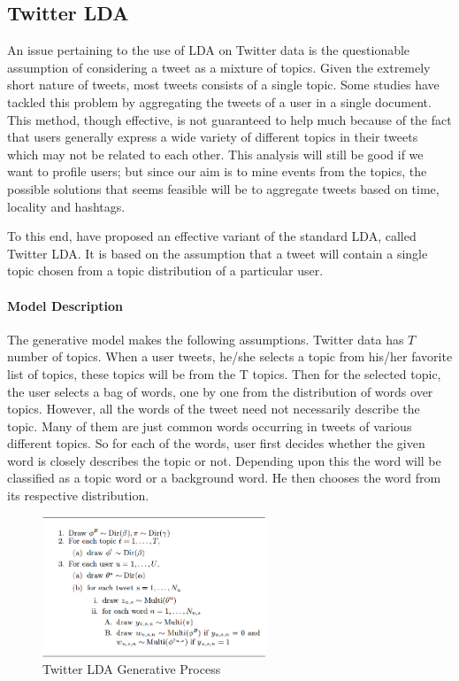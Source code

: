 \subsection{Twitter LDA}{\label{sec:pipeline:tlda}}
An issue pertaining to the use of LDA on Twitter data is the questionable assumption of considering a tweet as a mixture of topics. Given the extremely short nature of tweets, most tweets consists of a single topic. Some studies have tackled this problem by aggregating the tweets of a user in a single document. This method, though effective, is not guaranteed to help much because of the fact that users generally express a wide variety of different topics in their tweets which may not be related to each other. This analysis will still be good if we want to profile users; but since our aim is to mine events from the topics, the possible solutions that seems feasible will be to aggregate tweets based on time, locality and hashtags.

To this end, \cite{zhao2011comparing} have proposed an effective variant of the standard LDA, called Twitter LDA. It is based on the assumption that a tweet will contain a single topic chosen from a topic distribution of a particular user. 

\paragraph{Model Description} 
The generative model makes the following assumptions. Twitter data has $T$ number of topics. When a user tweets, he/she selects a topic from his/her favorite list of topics, these topics will be from the T topics. Then for the selected topic, the user selects a bag of words, one by one from the distribution of words over topics. However, all the words of the tweet need not necessarily describe the topic. Many of them are just common words occurring in tweets of various different topics. So for each of the words, user first decides whether the given word is closely describes the topic or not. Depending upon this the word will be classified as a topic word or a background word. He then chooses the word from its respective distribution.

 \begin{figure}
 \centering
 \includegraphics[width=0.6\textwidth]{lda-algo}
 \caption{Twitter LDA Generative Process}
 \label{fig:twitterlda-algo}
\end{figure}

